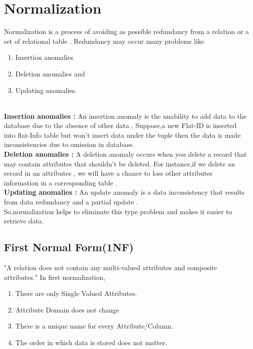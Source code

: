 \section{Normalization}\label{sec:norm}
Normalization is a process of avoiding as possible redundancy from a relation or a set of relational table . Redundancy may occur many problems like \begin{enumerate}
\item Insertion anomalies
\item Deletion anomalies and 
\item Updating anomalies.
\end{enumerate}
\\
 
\noindent  
\textbf{Insertion anomalies : }An insertion anomaly is the unability to add data to the database due to the absence of other data . Suppose,a new  Flat-ID is inserted into flat-Info table but won't insert  data under the tuple then the data is made inconsistencies due to omission in database.\\

\noindent
\textbf{Deletion anomalies : }A deletion anomaly occurs when you delete a record that may contain attributes that shouldn’t be deleted. For instance,if we delete an record in an attributes , we will have a chance to loss  other attributes information in  a corresponding table .\\
\noindent
\textbf{Updating anomalies : }An update anomaly is a data inconsistency that results from data redundancy and a partial update .
\\
So,normalization  helps to eliminate this type problem and  makes it easier  to retrieve data.

\subsection{First Normal Form(1NF)}
"A relation does not contain any multi-valued attributes and composite attributes." In first normalization,
\begin{enumerate}
\item There are only Single Valued Attributes.
\item Attribute Domain does not change
\item There is a unique name for every Attribute/Column.
\item The order in which data is stored does not matter.
\end{enumerate}
 

